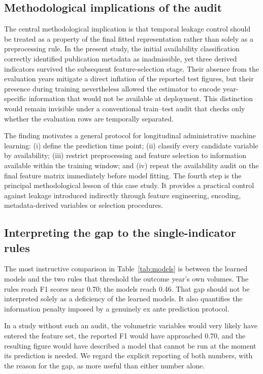 \documentclass[sn-vancouver,Numbered]{sn-jnl}
\begin{document}
\subsection{Methodological implications of the audit}

The central methodological implication is that temporal leakage control should be treated as a property of the final fitted representation rather than solely as a preprocessing rule. In the present study, the initial availability classification correctly identified publication metadata as inadmissible, yet three derived indicators survived the subsequent feature-selection stage. Their absence from the evaluation years mitigate a direct inflation of the reported test figures, but their presence during training nevertheless allowed the estimator to encode year-specific information that would not be available at deployment. This distinction would remain invisible under a conventional train--test audit that checks only whether the evaluation rows are temporally separated.

The finding motivates a general protocol for longitudinal administrative machine learning: (i) define the prediction time point; (ii) classify every candidate variable by availability; (iii) restrict preprocessing and feature selection to information available within the training window; and (iv) repeat the availability audit on the final feature matrix immediately before model fitting. The fourth step is the principal methodological lesson of this case study. It provides a practical control against leakage introduced indirectly through feature engineering, encoding, metadata-derived variables or selection procedures.

\subsection{Interpreting the gap to the single-indicator rules}

The most instructive comparison in Table~\ref{tab:models} is between the learned models and the two rules that threshold the outcome year's own volumes. The rules reach F1 scores near 0.70; the models reach 0.46. That gap should not be interpreted solely as a deficiency of the learned models. It also quantifies the information penalty imposed by a genuinely ex ante prediction protocol.

In a study without such an audit, the volumetric variables would very likely have entered the feature set, the reported F1 would have approached 0.70, and the resulting figure would have described a model that cannot be run at the moment its prediction is needed. We regard the explicit reporting of both numbers, with the reason for the gap, as more useful than either number alone.
\end{document}
